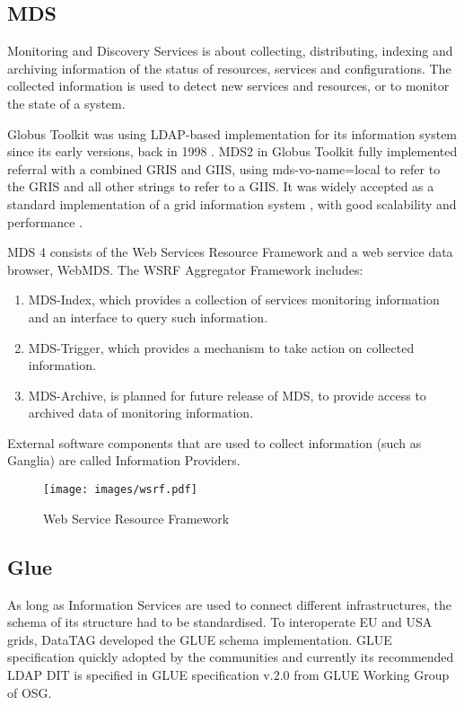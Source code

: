 \subsection{MDS}
Monitoring and Discovery Services is about collecting, distributing, indexing
and archiving information of the status of resources, services and
configurations. The collected information is used to detect new services and
resources, or to monitor the state of a system.

Globus Toolkit was using LDAP-based implementation for its information system
since its early versions, back in 1998 \cite{von1998usage}. MDS2 in Globus
Toolkit fully implemented referral with a combined GRIS and GIIS, using
mds-vo-name=local to refer to the GRIS and all other strings to refer to a
GIIS. It was widely accepted as a standard implementation of a grid information
system \cite{945188}, with good scalability and performance
\cite{zhang2004performance}.


MDS 4 consists of the Web Services Resource Framework and a web service data
browser, WebMDS. The WSRF Aggregator Framework includes:

\begin{enumerate}
  \item MDS-Index, which provides a collection of services monitoring
  information and an interface to query such information.
  \item MDS-Trigger, which provides a mechanism to take action on collected
  information.
  \item MDS-Archive, is planned for future release of MDS, to provide access to
  archived data of monitoring information.
\end{enumerate}

External software components that are used to collect information (such as
Ganglia)\cite{gangliaWSRF} are called Information Providers.

\begin{figure}[htb]
\centering
 \texttt{[image: images/wsrf.pdf]}
\caption{Web Service Resource Framework}
\label{figure:wsrf}
\end{figure}

\subsection{Glue}
As long as Information Services are used to connect different infrastructures,
the schema of its structure had to be standardised. To interoperate EU and USA
grids, DataTAG developed the GLUE schema implementation. GLUE specification
quickly adopted by the communities and currently its recommended LDAP DIT is
specified in GLUE specification v.$2.0$ from GLUE Working Group of OSG.

